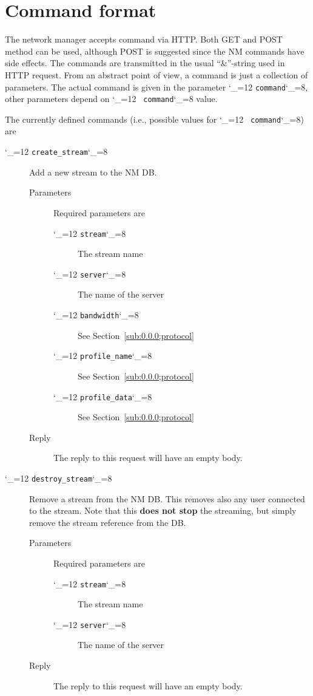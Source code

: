 \documentclass[a4paper,10pt]{medusabook}
\def\ttt{\catcode`\_=12 \tttii}
\def\tttii#1!{{\tt #1}\catcode`\_=8{}}
\begin{document}
\section{Command format}
\label{sect:0.1;protocol}

The network manager accepts command via HTTP.  Both GET and POST
method can be used, although POST is suggested since the NM commands
have side effects.  The commands are transmitted in the usual
``\&''-string used in HTTP request.  From an abstract point of view, a
command is just a collection of parameters.  The actual command is
given in the parameter \ttt command!, other parameters depend on \ttt
command! value.

The currently defined commands (i.e., possible values for \ttt
command!) are

\begin{description}
\item[\ttt create\_stream!]  Add a new stream to the NM DB.  
  \begin{description}
\item[Parameters]
Required
  parameters are
  \begin{description}
    \item[\ttt stream!] The stream name
    \item[\ttt server!] The name of the server
    \item[\ttt bandwidth!]  See Section~\ref{sub:0.0.0;protocol}
    \item[\ttt profile\_name!] See Section~\ref{sub:0.0.0;protocol}
    \item[\ttt profile\_data!] See Section~\ref{sub:0.0.0;protocol}
  \end{description}
\item[Reply]
The reply to this request will have an empty body.
  \end{description}

\item[\ttt destroy\_stream!]
Remove a stream from the NM DB.  This removes also any user connected
to the stream.  Note that this \textbf{does not stop} the streaming,
but simply remove the stream reference from the DB.  
\begin{description}
\item[Parameters]
Required parameters are
  \begin{description}
    \item[\ttt stream!] The stream name
    \item[\ttt server!] The name of the server
  \end{description}
\item[Reply]
The reply to this request will have an empty body.
\end{description}


\end{description}
\end{document}
